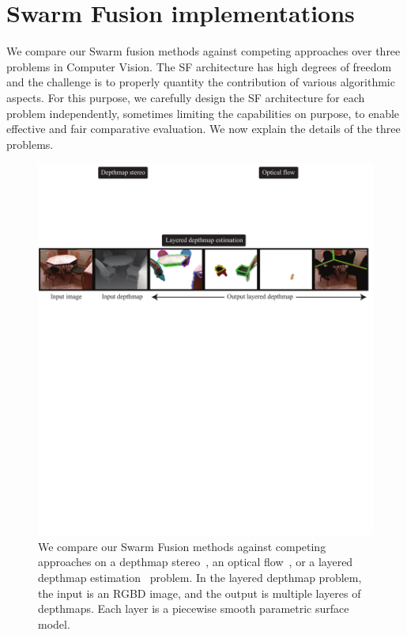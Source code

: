 \section{Swarm Fusion implementations }
We compare our Swarm fusion methods against competing approaches over
three problems in Computer Vision. The SF architecture has high degrees
of freedom and the challenge is to properly quantity the contribution of
various algorithmic aspects. For this purpose, we carefully design the
SF architecture for each problem independently, sometimes limiting the
capabilities on purpose, to enable effective and fair comparative
evaluation.  We now explain the details of the three problems.

%
\begin{figure}[tb]
 \includegraphics[width=\columnwidth]{figure/problem.pdf} \caption{We
 compare our Swarm Fusion methods against competing approaches on a
 depthmap stereo~\cite{middle_bury_stereo}, an optical
 flow~\cite{middlebury_optical_flow}, or a layered depthmap
 estimation~\cite{layered_depthmap} problem. In the layered depthmap
 problem, the input is an RGBD image, and the output is multiple layeres
 of depthmaps. Each layer is a piecewise smooth parametric surface
 model.}\label{fig:problem}
\end{figure}



